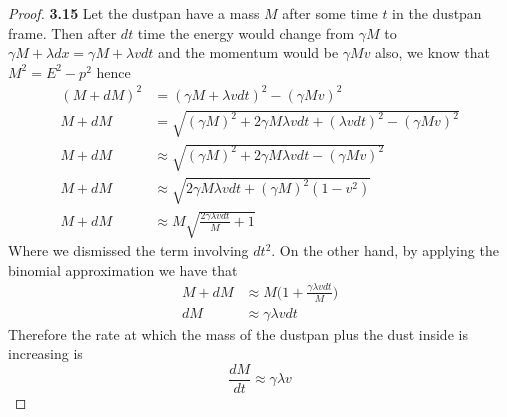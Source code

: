 \documentclass[11pt]{article}
\theoremstyle{definition}
\begin{document}
\begin{proof}{\textbf{3.15}}
    Let the dustpan have a mass $M$ after some time $t$ in the dustpan frame.
    Then after $dt$ time the energy would change from $\gamma M$ to
    $\gamma M + \lambda dx = \gamma M + \lambda v dt$ and the momentum would be
    $\gamma M v$ also, we know that $M^2 = E^2 - p^2$ hence
    \begin{align*}
        (M + dM)^2 &= (\gamma M + \lambda v dt)^2 - (\gamma M v)^2\\
        M + dM &= \sqrt{(\gamma M)^2 + 2\gamma M\lambda v dt + (\lambda v dt)^2 - (\gamma M v)^2}\\
        M + dM &\approx \sqrt{(\gamma M)^2 + 2\gamma M\lambda v dt - (\gamma M v)^2}\\
        M + dM &\approx \sqrt{2\gamma M\lambda v dt + (\gamma M)^2(1 - v^2)}\\
        M + dM &\approx M\sqrt{\frac{2\gamma \lambda v dt}{M} + 1}
    \end{align*}
    Where we dismissed the term involving $dt^2$. On the other hand, by
    applying the binomial approximation we have that
    \begin{align*}
        M + dM &\approx M\bigg(1 + \frac{\gamma \lambda v dt}{M}\bigg)\\
        dM &\approx \gamma \lambda v dt
    \end{align*}
    Therefore the rate at which the mass of the dustpan plus the dust inside
    is increasing is
    $$\frac{dM}{dt} \approx \gamma \lambda v$$
\end{proof}
\cleardoublepage
\end{document}
